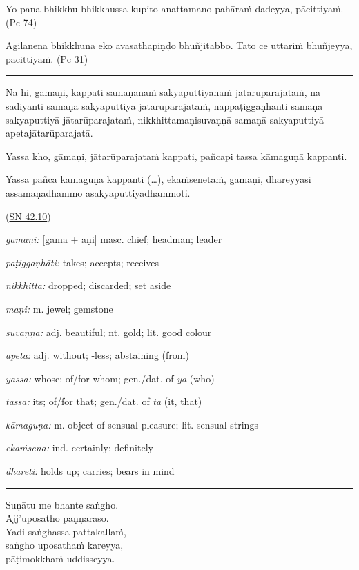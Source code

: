 \documentclass[11pt,oneside]{memoir}
\begin{document}
Yo pana bhikkhu bhikkhussa kupito anattamano pahāraṁ dadeyya, pācittiyaṁ. (Pc 74)

Agilānena bhikkhunā eko āvasathapiṇḍo bhuñjitabbo. Tato ce uttariṁ bhuñjeyya, pācittiyaṁ. (Pc 31)

\noindent\rule{\textwidth}{0.5pt}

\begin{widecols}
Na hi, gāmaṇi, kappati samaṇānaṁ sakyaputtiyānaṁ jātarūparajataṁ, na sādiyanti samaṇā sakyaputtiyā jātarūparajataṁ, nappaṭiggaṇhanti samaṇā sakyaputtiyā jātarūparajataṁ, nikkhittamaṇisuvaṇṇā samaṇā sakyaputtiyā apetajātarūparajatā.

Yassa kho, gāmaṇi, jātarūparajataṁ kappati, pañcapi tassa kāmaguṇā kappanti.

Yassa pañca kāmaguṇā kappanti (…), ekaṁsenetaṁ, gāmaṇi, dhāreyyāsi assamaṇadhammo asakyaputtiyadhammoti.

(\href{https://suttacentral.net/sn42.10/pli/ms}{SN 42.10})

\columnbreak

\emph{gāmaṇi:} [gāma + aṇi] masc. chief; headman; leader

\emph{paṭiggaṇhāti:} takes; accepts; receives

\emph{nikkhitta:} dropped; discarded; set aside

\emph{maṇi:} m. jewel; gemstone

\emph{suvaṇṇa:} adj. beautiful; nt. gold; lit. good colour

\emph{apeta:} adj. without; -less; abstaining (from)

\emph{yassa:} whose; of/for whom; gen./dat. of \emph{ya} (who)

\emph{tassa:} its; of/for that; gen./dat. of \emph{ta} (it, that)

\emph{kāmaguṇa:} m. object of sensual pleasure; lit. sensual strings

\emph{ekaṁsena:} ind. certainly; definitely

\emph{dhāreti:} holds up; carries; bears in mind
\end{widecols}

\noindent\rule{\textwidth}{0.5pt}

Suṇātu me bhante saṅgho. \\[0pt]
Ajj'uposatho paṇṇaraso. \\[0pt]
Yadi saṅghassa pattakallaṁ, \\[0pt]
saṅgho uposathaṁ kareyya, \\[0pt]
pāṭimokkhaṁ uddisseyya.
\end{document}

